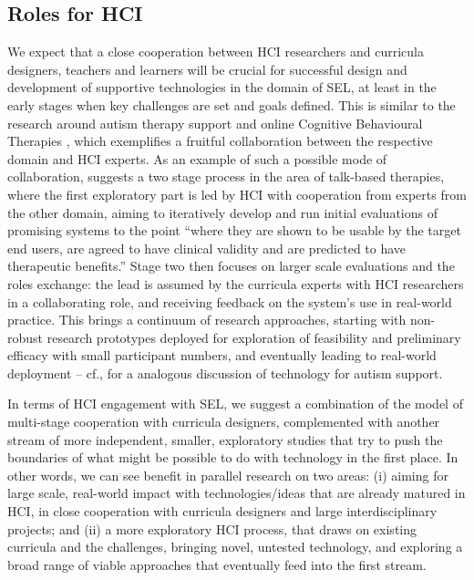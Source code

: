\documentclass[prodmode,acmtochi]{acmsmall}
\begin{document}
\subsection*{Roles for HCI}


We expect that a close cooperation between HCI researchers and curricula designers, teachers and learners will be crucial for successful design and development of supportive technologies in the domain of SEL, at least in the early stages when key challenges are set and goals defined. This is similar to the research around autism therapy support \cite{Kientz2013} and online Cognitive Behavioural Therapies \cite{Bendall2014,Porayska-Pomsta2011}, which exemplifies a fruitful collaboration between the respective domain and HCI experts.
%
As an example of such a possible mode of collaboration,  suggests a two stage process in the area of talk-based therapies, where the first exploratory part is led by HCI with cooperation from experts from the other domain, aiming to iteratively develop and run initial evaluations of promising systems to the point ``where they are shown to be usable by the target end users, are agreed to have clinical validity and are predicted to have therapeutic benefits.'' Stage two then focuses on larger scale evaluations and the roles exchange: the lead is assumed by the curricula experts with HCI researchers in a collaborating role, and receiving feedback on the system's use in real-world practice. 
%
This brings a continuum of research approaches, starting with non-robust research prototypes deployed for exploration of feasibility and preliminary efficacy with small participant numbers, and eventually leading to real-world deployment -- cf., \cite[p.105-1-06]{Kientz2013} for a analogous discussion of technology for autism support.

In terms of HCI engagement with SEL, we suggest a combination of the  model of multi-stage cooperation with curricula designers, complemented %
with another stream of more independent, smaller, exploratory studies that try to push the boundaries of what might be possible to do with technology in the first place.  In other words, we can see benefit in parallel research on two areas: (i) aiming for large scale, real-world impact with technologies/ideas that are already matured in HCI, in close cooperation with curricula designers and large interdisciplinary projects; and (ii) a more exploratory HCI process, that draws on existing curricula and the challenges, bringing novel, untested technology, and exploring a broad range of viable approaches that eventually feed into the first stream. 
\end{document}
